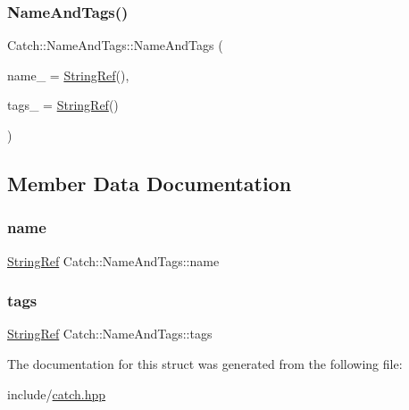 \subsubsection{\texorpdfstring{NameAndTags()}{NameAndTags()}}
{\footnotesize\ttfamily Catch\+::\+Name\+And\+Tags\+::\+Name\+And\+Tags (\begin{DoxyParamCaption}\item[{\mbox{\hyperlink{class_catch_1_1_string_ref}{String\+Ref}} const \&}]{name\+\_\+ = {\ttfamily \mbox{\hyperlink{class_catch_1_1_string_ref}{String\+Ref}}()},  }\item[{\mbox{\hyperlink{class_catch_1_1_string_ref}{String\+Ref}} const \&}]{tags\+\_\+ = {\ttfamily \mbox{\hyperlink{class_catch_1_1_string_ref}{String\+Ref}}()} }\end{DoxyParamCaption})\hspace{0.3cm}{\ttfamily [noexcept]}}



\subsection{Member Data Documentation}
\mbox{\label{struct_catch_1_1_name_and_tags_a7cbea60e0cebfa622c667008eb011420}} 
\subsubsection{\texorpdfstring{name}{name}}
{\footnotesize\ttfamily \mbox{\hyperlink{class_catch_1_1_string_ref}{String\+Ref}} Catch\+::\+Name\+And\+Tags\+::name}

\mbox{\label{struct_catch_1_1_name_and_tags_a74062ed1138834a348424eb7ed900c57}} 
\subsubsection{\texorpdfstring{tags}{tags}}
{\footnotesize\ttfamily \mbox{\hyperlink{class_catch_1_1_string_ref}{String\+Ref}} Catch\+::\+Name\+And\+Tags\+::tags}



The documentation for this struct was generated from the following file\+:\begin{DoxyCompactItemize}
\item 
include/\mbox{\hyperlink{catch_8hpp}{catch.\+hpp}}\end{DoxyCompactItemize}
